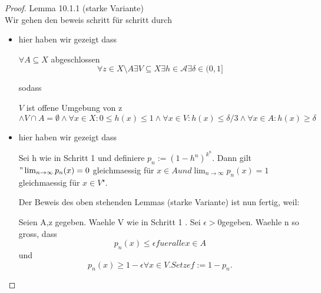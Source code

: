 
\begin{proof}{Lemma 10.1.1 (starke Variante)}\\
Wir gehen den beweis schritt für schritt durch
   \begin{itemize}
    \item[Schritt 1:] hier haben wir gezeigt dass

$\forall A \subseteq X$ abgeschlossen
$$
\forall z \in X \setminus A
\exists V \subseteq X
\exists h \in \mathcal A
\exists \delta \in (0,1]
$$

sodass

$V$ ist offene Umgebung von z
$$\wedge
V \cap A = \emptyset
\wedge
\forall x \in X : 0 \leq h(x) \leq 1
\wedge
\forall x \in V : h(x) \leq \delta/3
\wedge
\forall x \in A : h(x) \geq \delta$$

\item[Schritt 2:] hier haben wir gezeigt dass

Sei h wie in Schritt 1 und definiere 
$p_n := (1-h^n)^{k^n}$. Dann gilt $"\lim_{n\to\infty} p_n(x) = 0$
 gleichmaessig für $x \in A und \lim_{n\to\infty} p_n(x) = 1$ gleichmaessig für 
 $x \in V$".

Der Beweis des oben stehenden Lemmas (starke Variante) ist nun fertig, weil:

Seien A,z gegeben. Waehle V wie in Schritt 1
. Sei $\epsilon>0$gegeben. Waehle n so gross, dass 
$$p_n(x) \leq \epsilon fuer alle x \in A$$ und 
$$p_n(x) \geq 1-\epsilon \forall x \in V. Setze f := 1-p_n.$$
\end{itemize}
\end{proof}


